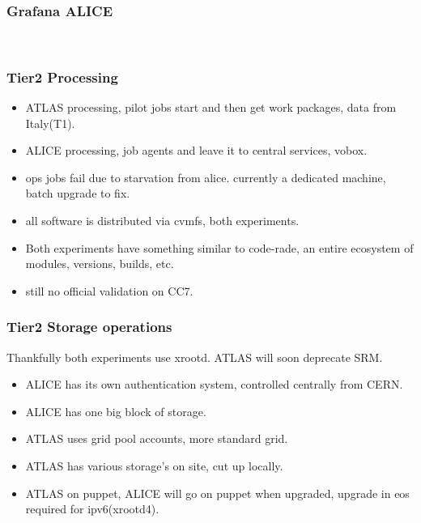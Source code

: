 \documentclass{beamer}
\begin{document}
\begin{frame}
  \frametitle{Grafana ALICE}
  \\
\end{frame}

\begin{frame}
  \frametitle{Tier2 Processing}
  \begin{itemize}
      \item ATLAS processing, pilot jobs start and then get work packages, data from Italy(T1).
    \item ALICE processing, job agents and leave it to central services, vobox.
    \item ops jobs fail due to starvation from alice. currently a dedicated machine, batch upgrade to fix.
    \item all software is distributed via cvmfs, both experiments.
    \item Both experiments have something similar to code-rade, an entire ecosystem of modules, versions, builds, etc.
    \item still no official validation on CC7.
  \end{itemize}
\end{frame}

\begin{frame}
  \frametitle{Tier2 Storage operations}
  Thankfully both experiments use xrootd. ATLAS will soon deprecate SRM.
  \begin{itemize}
    \item ALICE has its own authentication system, controlled centrally from CERN.
    \item ALICE has one big block of storage.
    \item ATLAS uses grid pool accounts, more standard grid.
    \item ATLAS has various storage's on site, cut up locally.
    \item ATLAS on puppet, ALICE will go on puppet when upgraded, upgrade in eos required for ipv6(xrootd4).
  \end{itemize}
\end{frame}
\end{document}
